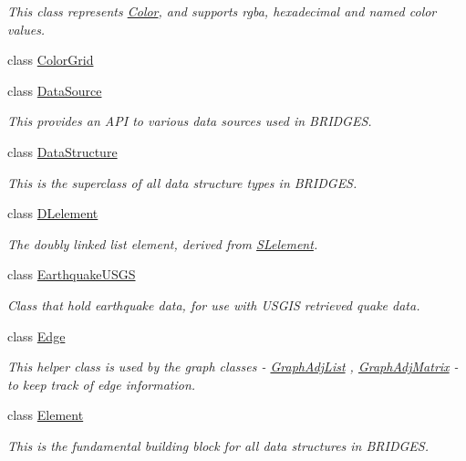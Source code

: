\begin{DoxyCompactItemize}
\begin{DoxyCompactList}\small\item\em This class represents \mbox{\hyperlink{classbridges_1_1_color}{Color}}, and supports rgba, hexadecimal and named color values. \end{DoxyCompactList}\item 
class \mbox{\hyperlink{classbridges_1_1_color_grid}{Color\+Grid}}
\item 
class \mbox{\hyperlink{classbridges_1_1_data_source}{Data\+Source}}
\begin{DoxyCompactList}\small\item\em This provides an A\+PI to various data sources used in B\+R\+I\+D\+G\+ES. \end{DoxyCompactList}\item 
class \mbox{\hyperlink{classbridges_1_1_data_structure}{Data\+Structure}}
\begin{DoxyCompactList}\small\item\em This is the superclass of all data structure types in B\+R\+I\+D\+G\+ES. \end{DoxyCompactList}\item 
class \mbox{\hyperlink{classbridges_1_1_d_lelement}{D\+Lelement}}
\begin{DoxyCompactList}\small\item\em The doubly linked list element, derived from \mbox{\hyperlink{classbridges_1_1_s_lelement}{S\+Lelement}}. \end{DoxyCompactList}\item 
class \mbox{\hyperlink{classbridges_1_1_earthquake_u_s_g_s}{Earthquake\+U\+S\+GS}}
\begin{DoxyCompactList}\small\item\em Class that hold earthquake data, for use with U\+S\+G\+IS retrieved quake data. \end{DoxyCompactList}\item 
class \mbox{\hyperlink{classbridges_1_1_edge}{Edge}}
\begin{DoxyCompactList}\small\item\em This helper class is used by the graph classes -\/ \mbox{\hyperlink{classbridges_1_1_graph_adj_list}{Graph\+Adj\+List}} , \mbox{\hyperlink{classbridges_1_1_graph_adj_matrix}{Graph\+Adj\+Matrix}} -\/ to keep track of edge information. \end{DoxyCompactList}\item 
class \mbox{\hyperlink{classbridges_1_1_element}{Element}}
\begin{DoxyCompactList}\small\item\em This is the fundamental building block for all data structures in B\+R\+I\+D\+G\+ES. \end{DoxyCompactList}\item 

\end{DoxyCompactItemize}
